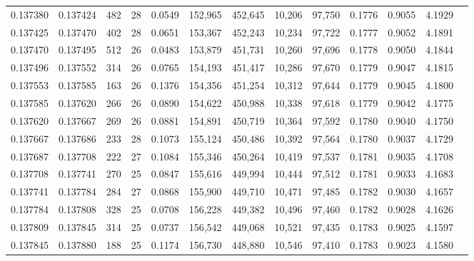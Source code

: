 \begin{tabular}{rrrrrrrrrrrrr}
0.137380 & 0.137424 & 482 &  28 &                                     0.0549 & 152,965 & 452,645 &  10,206 &  97,750 & 0.1776 & 0.9055 & 4.1929 \\
0.137425 & 0.137470 & 402 &  28 &                                     0.0651 & 153,367 & 452,243 &  10,234 &  97,722 & 0.1777 & 0.9052 & 4.1891 \\
0.137470 & 0.137495 & 512 &  26 &                                     0.0483 & 153,879 & 451,731 &  10,260 &  97,696 & 0.1778 & 0.9050 & 4.1844 \\
0.137496 & 0.137552 & 314 &  26 &                                     0.0765 & 154,193 & 451,417 &  10,286 &  97,670 & 0.1779 & 0.9047 & 4.1815 \\
0.137553 & 0.137585 & 163 &  26 &                                     0.1376 & 154,356 & 451,254 &  10,312 &  97,644 & 0.1779 & 0.9045 & 4.1800 \\
0.137585 & 0.137620 & 266 &  26 &                                     0.0890 & 154,622 & 450,988 &  10,338 &  97,618 & 0.1779 & 0.9042 & 4.1775 \\
0.137620 & 0.137667 & 269 &  26 &                                     0.0881 & 154,891 & 450,719 &  10,364 &  97,592 & 0.1780 & 0.9040 & 4.1750 \\
0.137667 & 0.137686 & 233 &  28 &                                     0.1073 & 155,124 & 450,486 &  10,392 &  97,564 & 0.1780 & 0.9037 & 4.1729 \\
0.137687 & 0.137708 & 222 &  27 &                                     0.1084 & 155,346 & 450,264 &  10,419 &  97,537 & 0.1781 & 0.9035 & 4.1708 \\
0.137708 & 0.137741 & 270 &  25 &                                     0.0847 & 155,616 & 449,994 &  10,444 &  97,512 & 0.1781 & 0.9033 & 4.1683 \\
0.137741 & 0.137784 & 284 &  27 &                                     0.0868 & 155,900 & 449,710 &  10,471 &  97,485 & 0.1782 & 0.9030 & 4.1657 \\
0.137784 & 0.137808 & 328 &  25 &                                     0.0708 & 156,228 & 449,382 &  10,496 &  97,460 & 0.1782 & 0.9028 & 4.1626 \\
0.137809 & 0.137845 & 314 &  25 &                                     0.0737 & 156,542 & 449,068 &  10,521 &  97,435 & 0.1783 & 0.9025 & 4.1597 \\
0.137845 & 0.137880 & 188 &  25 &                                     0.1174 & 156,730 & 448,880 &  10,546 &  97,410 & 0.1783 & 0.9023 & 4.1580 \\

\end{tabular}
